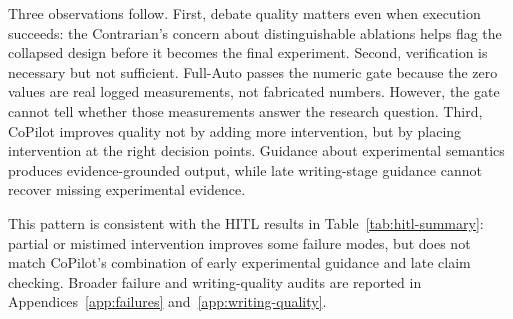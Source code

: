 Three observations follow. First, debate quality matters even when execution succeeds: the Contrarian's concern about distinguishable ablations helps flag the collapsed design before it becomes the final experiment. Second, verification is necessary but not sufficient. Full-Auto passes the numeric gate because the zero values are real logged measurements, not fabricated numbers. However, the gate cannot tell whether those measurements answer the research question. Third, CoPilot improves quality not by adding more intervention, but by placing intervention at the right decision points. Guidance about experimental semantics produces evidence-grounded output, while late writing-stage guidance cannot recover missing experimental evidence.

This pattern is consistent with the HITL results in Table~\ref{tab:hitl-summary}: partial or mistimed intervention improves some failure modes, but does not match CoPilot's combination of early experimental guidance and late claim checking. Broader failure and writing-quality audits are reported in Appendices~\ref{app:failures} and~\ref{app:writing-quality}.